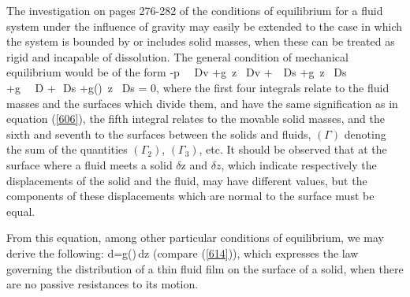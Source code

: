 \documentclass[12pt]{article}
\newcommand{\dd}{\delta}
\begin{document}
The investigation on pages 276-282 of the conditions of equilibrium for a fluid system  under the influence of gravity may easily be extended to the case in which the system is bounded by or includes solid masses, when these can be treated as rigid and incapable of dissolution. The general condition of mechanical equilibrium would be of the form
\eqs-\int p \, \dd \, Dv +\int g\gamma\, \dd z \, Dv +\int \sigma \, \dd \, Ds +\int g\Gamma \, \dd z \, Ds \\
+\int g \, \dd {} \, D +\int \varsigma \,\dd\, Ds +\int g(\Gamma)\, \dd z \, Ds = 0,  \label{680}  \eqe
where the first four integrals relate to the fluid masses and the surfaces which divide them, and have the same signification as in equation (\ref{606}), the fifth integral relates to the movable solid masses, and the sixth and seventh to the surfaces between the solids and fluids, $(\Gamma)$ denoting the sum of the quantities $(\Gamma_2)$, $(\Gamma_3)$, etc. It should be observed that at the surface where a fluid meets a solid $\dd \text{z}$ and $\dd z$, which indicate respectively the displacements of the solid and the fluid, may have different values, but the components of these displacements which are normal to the surface must be equal.

From this equation, among other particular conditions of equilibrium, we may derive the following:
\eqs d\varepsilon =g(\Gamma)\,dz    \label{681} \eqe
(compare (\ref{614})), which expresses the law governing the distribution of a thin fluid film on the surface of a solid, when there are no passive resistances to its motion.
\end{document}
